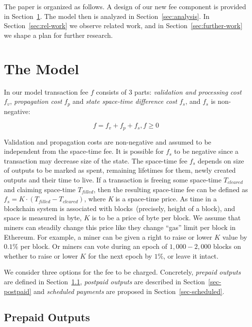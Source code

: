 \documentclass[]{llncs}   %
\begin{document}
The paper is organized as follows. A design of our new fee component is provided in Section~\ref{sec:model}. The model then is analyzed in Section~\ref{sec:analysis}. In Section~\ref{sec:rel-work} we observe related work, and in Section~\ref{sec:further-work} we shape a plan for further research.

\section{The Model}
\label{sec:model}

In our model transaction fee $f$ consists of 3 parts: \textit{validation and processing cost} $f_v$, \textit{propagation cost} $f_p$ and \textit{state space-time difference cost} $f_s$, and $f_s$ is non-negative:

\begin{equation}
f = f_v + f_p + f_s , f \ge 0
\end{equation}

Validation and propagation costs are non-negative and assumed to be independent from the space-time fee. It is possible for $f_s$ to be negative since a transaction may decrease size of the state. The space-time fee $f_s$ depends on size of outputs to be marked as spent, remaining lifetimes for them, newly created outputs and their time to live. If a transaction is freeing some space-time \textit{$T_{cleared}$} and claiming space-time \textit{$T_{filled}$}, then the  resulting space-time fee can be defined as $f_s = K \cdot (T_{filled} - T_{cleared})$, where \textit{K} is a space-time price. As time in a blockchain system is associated with blocks~(precisely, height of a block), and space is measured in byte, $K$ is to be a price of byte per block. We assume that miners can steadily change this price like they change ``gas'' limit per block in Ethereum. For example, a miner can be given a right to raise or lower $K$ value by $0.1\%$ per block. Or miners can vote during an epoch of $1,000-2,000$ blocks on whether to raise or lower $K$ for the next epoch by $1\%$, or leave it intact.

We consider three options for the fee to be charged. Concretely, \textit{prepaid outputs} are defined in Section~\ref{sec-prepaid}, \textit{postpaid outputs} are described in Section~\ref{sec-postpaid} and \textit{scheduled payments} are proposed in Section~\ref{sec-scheduled}.

\subsection{Prepaid Outputs}
\label{sec-prepaid}
\end{document}
